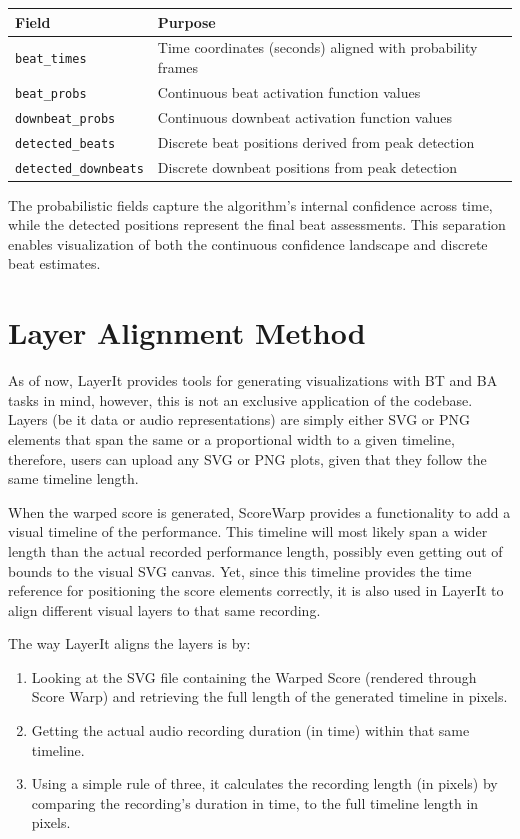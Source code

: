 \begin{table}[h]
\centering
\begin{tabular}{ll}
\hline
\textbf{Field} & \textbf{Purpose} \\
\hline
\texttt{beat\_times} & Time coordinates (seconds) aligned with probability frames \\
\texttt{beat\_probs} & Continuous beat activation function values \\
\texttt{downbeat\_probs} & Continuous downbeat activation function values \\
\texttt{detected\_beats} & Discrete beat positions derived from peak detection \\
\texttt{detected\_downbeats} & Discrete downbeat positions from peak detection \\
\hline
\end{tabular}
\end{table} \label{tab:npzStructure}

The probabilistic fields capture the algorithm's internal confidence across time, while the detected positions represent the final beat assessments. This separation enables visualization of both the continuous confidence landscape and discrete beat estimates.

\section{Layer Alignment Method}
As of now, LayerIt provides tools for generating visualizations with BT and BA tasks in mind, however, this is not an exclusive application of the codebase. Layers (be it data or audio representations) are simply either SVG or PNG elements that span the same or a proportional width to a given timeline, therefore, users can upload any SVG or PNG plots, given that they follow the same timeline length. 

When the warped score is generated, ScoreWarp provides a functionality to add a visual timeline of the performance. This timeline will most likely span a wider length than the actual recorded performance length, possibly even getting out of bounds to the visual SVG canvas. Yet, since this timeline provides the time reference for positioning the score elements correctly, it is also used in LayerIt to align different visual layers to that same recording.

The way LayerIt aligns the layers is by:
\begin{enumerate}
  \item Looking at the SVG file containing the Warped Score (rendered through Score Warp) and retrieving the full length of the generated timeline in pixels.
  \item Getting the actual audio recording duration (in time) within that same timeline.
  \item Using a simple rule of three, it calculates the recording length (in pixels) by comparing the recording's duration in time, to the full timeline length in pixels.
\end{enumerate} 

